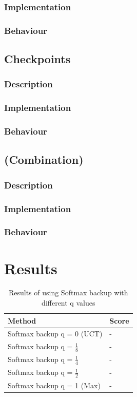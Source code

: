 \documentclass[10pt,a4paper]{article}
\begin{document}
\subsubsection{Implementation}


\subsubsection{Behaviour}
\subsection{Checkpoints}
\subsubsection{Description}
\subsubsection{Implementation}
\subsubsection{Behaviour}
\subsection{(Combination)}
\subsubsection{Description}
\subsubsection{Implementation}
\subsubsection{Behaviour}

\clearpage

\section{Results}
\renewcommand{\arraystretch}{1.5}
\begin{table}[h]
	\centering
	\begin{tabular}{| l | l |}
		\hline
		\textbf{Method} & \textbf{Score} 		\\ \hline
		Softmax backup q = 0 (UCT) 			& - \\ \hline
		Softmax backup q = $\frac{1}{8}$	& - \\ \hline
		Softmax backup q = $\frac{1}{4}$	& - \\ \hline
		Softmax backup q = $\frac{1}{2}$	& - \\ \hline
		Softmax backup q = 1 (Max)			& - \\ \hline
	\end{tabular}
	\caption{Results of using Softmax backup with different q values}
	\label{tab:softmax_results}
\end{table}
\end{document}
